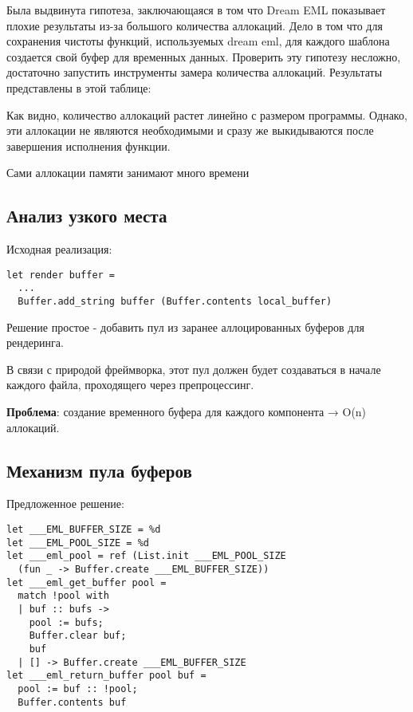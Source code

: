 Была выдвинута гипотеза, заключающаяся в том что Dream EML показывает плохие результаты из-за большого количества аллокаций. %
Дело в том что для сохранения чистоты функций, используемых dream eml, для каждого шаблона создается свой буфер для временных данных.
Проверить эту гипотезу несложно, достаточно запустить инструменты замера количества аллокаций. Результаты представлены в этой таблице:


Как видно, количество аллокаций растет линейно с размером программы. Однако, эти аллокации не являются необходимыми и сразу же выкидываются после завершения исполнения функции.

Сами аллокации памяти занимают много времени %


\subsection{Анализ узкого места}
Исходная реализация:
\begin{lstlisting}
let render buffer = 
  ...
  Buffer.add_string buffer (Buffer.contents local_buffer)
\end{lstlisting}


Решение простое - добавить пул из заранее аллоцированных буферов для рендеринга.

В связи с природой фреймворка, этот пул должен будет создаваться в начале каждого файла, проходящего через препроцессинг.

\textbf{Проблема}: создание временного буфера для каждого компонента → O(n) аллокаций.
\subsection{Механизм пула буферов}
Предложенное решение:
\begin{lstlisting}
let ___EML_BUFFER_SIZE = %d
let ___EML_POOL_SIZE = %d
let ___eml_pool = ref (List.init ___EML_POOL_SIZE 
  (fun _ -> Buffer.create ___EML_BUFFER_SIZE))
let ___eml_get_buffer pool =
  match !pool with
  | buf :: bufs ->
    pool := bufs;
    Buffer.clear buf;
    buf
  | [] -> Buffer.create ___EML_BUFFER_SIZE
let ___eml_return_buffer pool buf =
  pool := buf :: !pool;
  Buffer.contents buf

\end{lstlisting}



